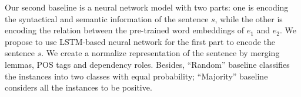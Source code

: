 
Our second baseline is a neural network model with two parts:
one is encoding the syntactical and semantic information of the sentence $s$, 
while the other is encoding the relation between the pre-trained word 
embeddings of $e_1$ and $e_2$.
We propose to use LSTM-based neural network for the first part to 
encode the sentence $s$.
We create a normalize representation of the sentence by merging 
lemmas, POS tags and dependency roles. Besides, ``Random'' baseline
classifies the instances into two classes with equal probability; 
``Majority'' baseline considers all the instances to be positive.

